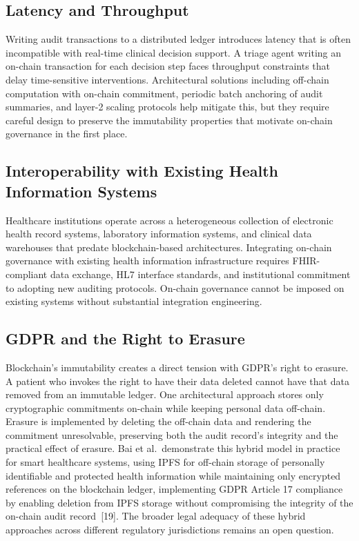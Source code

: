 \documentclass[11pt]{article}
\begin{document}
\subsection{Latency and Throughput}\label{latency-and-throughput}

Writing audit transactions to a distributed ledger introduces latency
that is often incompatible with real-time clinical decision support. A
triage agent writing an on-chain transaction for each decision step
faces throughput constraints that delay time-sensitive interventions.
Architectural solutions including off-chain computation with on-chain
commitment, periodic batch anchoring of audit summaries, and layer-2
scaling protocols help mitigate this, but they require careful design to
preserve the immutability properties that motivate on-chain governance
in the first place.

\subsection{Interoperability with Existing Health Information
Systems}\label{interoperability-with-existing-health-information-systems}

Healthcare institutions operate across a heterogeneous collection of
electronic health record systems, laboratory information systems, and
clinical data warehouses that predate blockchain-based architectures.
Integrating on-chain governance with existing health information
infrastructure requires FHIR-compliant data exchange, HL7 interface
standards, and institutional commitment to adopting new auditing
protocols. On-chain governance cannot be imposed on existing systems
without substantial integration engineering.

\subsection{GDPR and the Right to
Erasure}\label{gdpr-and-the-right-to-erasure}

Blockchain's immutability creates a direct tension with GDPR's right to
erasure. A patient who invokes the right to have their data deleted
cannot have that data removed from an immutable ledger. One
architectural approach stores only cryptographic commitments on-chain
while keeping personal data off-chain. Erasure is implemented by
deleting the off-chain data and rendering the commitment unresolvable,
preserving both the audit record's integrity and the practical effect of
erasure. Bai et al.~demonstrate this hybrid model in practice for smart
healthcare systems, using IPFS for off-chain storage of personally
identifiable and protected health information while maintaining only
encrypted references on the blockchain ledger, implementing GDPR Article
17 compliance by enabling deletion from IPFS storage without
compromising the integrity of the on-chain audit record~{[}19{]}. The
broader legal adequacy of these hybrid approaches across different
regulatory jurisdictions remains an open question.
\end{document}
